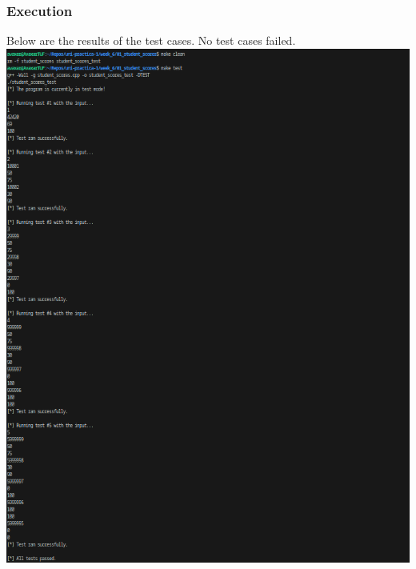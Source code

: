 \documentclass[12pt]{article}
\begin{document}
\subsubsection{Execution}
Below are the results of the test cases. No test cases failed.
\newline\includegraphics[width=\textwidth]{01_student_scores_test}
\end{document}
